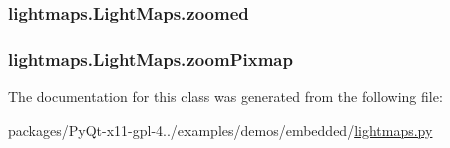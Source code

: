 \subsubsection[{zoomed}]{\setlength{\rightskip}{0pt plus 5cm}lightmaps.\+Light\+Maps.\+zoomed}\label{classlightmaps_1_1LightMaps_a2dbce513ce538de90e85fcfbd04c26bf}
\hypertarget{classlightmaps_1_1LightMaps_a1154c7b91a26982845ed4dc921cf24c4}{}
\subsubsection[{zoom\+Pixmap}]{\setlength{\rightskip}{0pt plus 5cm}lightmaps.\+Light\+Maps.\+zoom\+Pixmap}\label{classlightmaps_1_1LightMaps_a1154c7b91a26982845ed4dc921cf24c4}


The documentation for this class was generated from the following file\+:\begin{DoxyCompactItemize}
\item 
packages/\+Py\+Qt-\/x11-\/gpl-\/4../examples/demos/embedded/\hyperlink{lightmaps_8py}{lightmaps.\+py}\end{DoxyCompactItemize}
